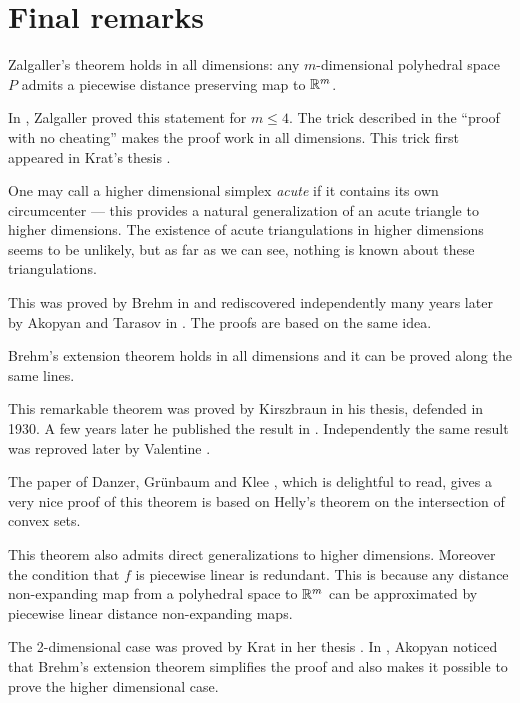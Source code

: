 \section*{Final remarks}\label{sec:pdp-comments}


Zalgaller's theorem holds in all dimensions: any $m$-dimensional polyhedral space $P$ admits a piecewise distance preserving map to $\mathbb{R}^m$.

In \cite{zalgaller-PL}, Zalgaller proved this statement for $m\le 4$.
The trick described in the ``proof with no cheating'' makes the proof work in all dimensions. 
This trick first appeared in Krat's thesis \cite{krat}.

One may call a higher dimensional simplex \emph{acute}
if it contains its own circumcenter
--- 
this provides a natural generalization of an acute triangle to higher dimensions.
The existence of acute triangulations in higher dimensions seems to be unlikely, but as far as we can see, nothing is known about these triangulations.

This was proved  by Brehm in \cite{brehm}
and rediscovered independently many years later by Akopyan and Tarasov in \cite{akopyan-tarasov}.
The proofs are based on the same idea. 


Brehm's extension theorem holds in all dimensions
and it can be proved along the same lines.

This remarkable theorem was proved by Kirszbraun in his thesis, defended in 1930. 
A few years later he published the result in \cite{kirszbraun}.
Independently the same result was reproved later by  Valentine \cite{valentine}.

The paper of Danzer, Gr\"unbaum and Klee \cite{DGK}, which is delightful to read, gives a very nice proof of this theorem is based on Helly's theorem on the intersection of convex sets.

This theorem 
also admits direct generalizations to higher dimensions.
Moreover the condition that $f$ is piecewise linear is redundant.
This is because
any distance non-expanding map from a polyhedral space to $\mathbb{R}^m$ can be approximated by piecewise linear distance non-expanding maps.


The 2-dimensional case was proved by Krat 
in her thesis \cite{krat}.
In \cite{akopyan},
Akopyan noticed that Brehm's extension theorem simplifies the proof and also makes it possible 
to prove the higher dimensional case.


